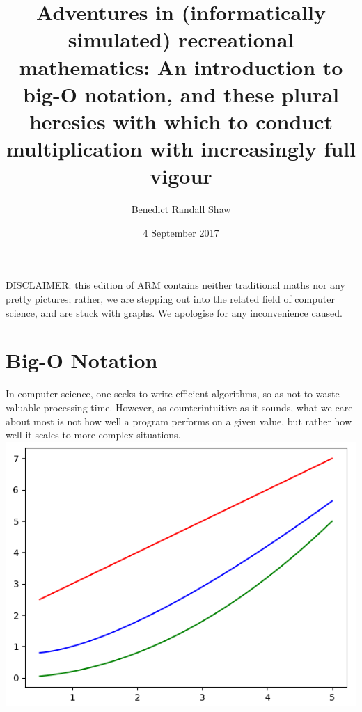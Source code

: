\documentclass{article}
\begin{document}
\title{Adventures in (informatically simulated) recreational mathematics: An introduction to big-O notation, and these plural heresies with which to conduct multiplication with increasingly full vigour}
\date{4 September 2017}
\author{Benedict Randall Shaw}

\maketitle

DISCLAIMER: this edition of ARM contains neither traditional maths nor any pretty pictures; rather, we are stepping out into the related field of computer science, and are stuck with graphs. We apologise for any inconvenience caused.

\section{Big-O Notation}

In computer science, one seeks to write efficient algorithms, so as not to waste valuable processing time. However, as counterintuitive as it sounds, what we care about most is not how well a program performs on a given value, but rather how well it scales to more complex situations.\\

\includegraphics{smallgraph}
\end{document}
